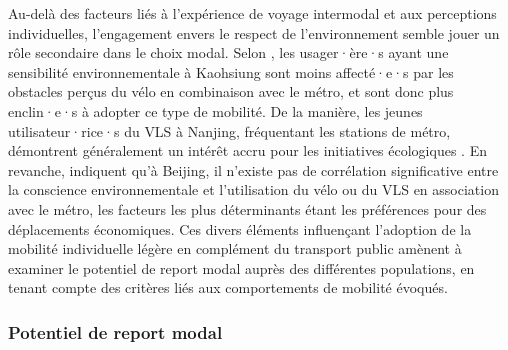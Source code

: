 \begin{refsegment}
Au-delà des facteurs liés à l'expérience de voyage intermodal et aux perceptions individuelles, l'engagement envers le respect de l'environnement semble jouer un rôle secondaire dans le choix modal. Selon \textcolor{blue}{\textcite[1~700]{cheng_evaluating_2012}}, les usager·ère·s ayant une sensibilité environnementale à Kaohsiung sont moins affecté·e·s par les obstacles perçus du vélo en combinaison avec le métro, et sont donc plus enclin·e·s à adopter ce type de mobilité. De la manière, les jeunes utilisateur·rice·s du \acrshort{VLS} à Nanjing, fréquentant les stations de métro, démontrent généralement un intérêt accru pour les initiatives écologiques \textcolor{blue}{\autocite[5]{yang_empirical_2016}}. En revanche, \textcolor{blue}{\textcite[57]{zhao_bicycle-metro_2017}} indiquent qu'à Beijing, il n'existe pas de corrélation significative entre la conscience environnementale et l'utilisation du vélo ou du \acrshort{VLS} en association avec le métro, les facteurs les plus déterminants étant les préférences pour des déplacements économiques. Ces divers éléments influençant l'adoption de la mobilité individuelle légère en complément du transport public amènent à examiner le potentiel de report modal auprès des différentes populations, en tenant compte des critères liés aux comportements de mobilité évoqués.%

\subsubsection*{Potentiel de report modal
    \label{chap2:potentiel-report-modal}
    }
    

\end{refsegment}
